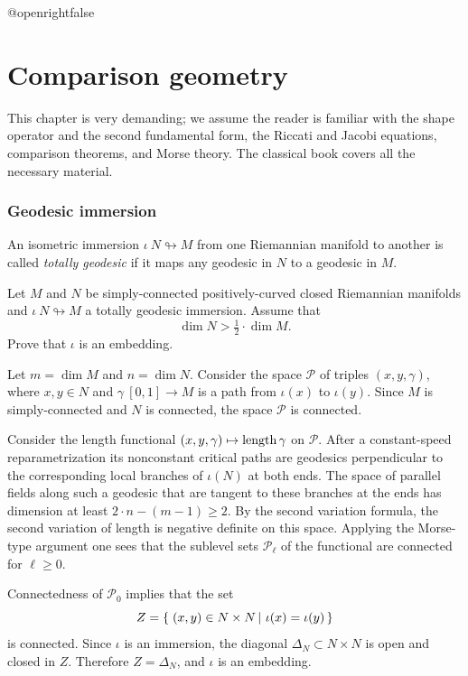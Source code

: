 \csname @openrightfalse\endcsname
\chapter{Comparison geometry}

This chapter is very demanding;
we assume the reader is familiar with the shape operator and the second fundamental form,
the Riccati and Jacobi equations,
comparison theorems,
and Morse theory.
The classical book \cite{cheeger-ebin} covers all the necessary material.



\subsection*{Geodesic immersion\hard}
\label{Geodesic immersion}

An isometric immersion $\iota\:N\looparrowright M$ from one Riemannian manifold to another is called \emph{totally geodesic} if it maps any geodesic in $N$ to a geodesic in $M$.

\begin{pr}
Let $M$ and $N$ be simply-connected positively-curved closed Riemannian manifolds and $\iota\:N\looparrowright M$ a totally geodesic immersion.
Assume that 
\[\dim N>\tfrac 12\cdot \dim M.\]
Prove that $\iota$ is an embedding.
\end{pr}

Let $m=\dim M$ and $n=\dim N$.
Consider the space $\mathcal P$ of triples $(x,y,\gamma)$,
where $x,y\in N$ and $\gamma\:[0,1]\to M$ is a path
from $\iota(x)$ to $\iota(y)$.
Since $M$ is simply-connected and $N$ is connected,
the space $\mathcal P$ is connected.

Consider the length functional $(x,y,\gamma)\mapsto\operatorname{\rm length}\gamma$ on $\mathcal P$.
After a constant-speed reparametrization its  nonconstant critical paths are geodesics perpendicular to the corresponding local branches of $\iota(N)$ at both ends.
The space of parallel fields along such a geodesic that are tangent to these branches at the ends has dimension at least $2\cdot n-(m-1)\ge2$.
By the second variation formula, the second variation of length is negative definite on this space.
Applying the Morse-type argument one sees that the sublevel sets $\mathcal P_\ell$ of the functional are connected for $\ell\ge 0$.

Connectedness of $\mathcal P_0$ implies that the set
\[Z=\set{(x,y)\in N\times N}{\iota(x)=\iota(y)}\]
is connected.
Since $\iota$ is an immersion,
the diagonal $\Delta_N\subset N\times N$ is open and closed in $Z$.
Therefore $Z=\Delta_N$, and $\iota$ is an embedding.\qeds

